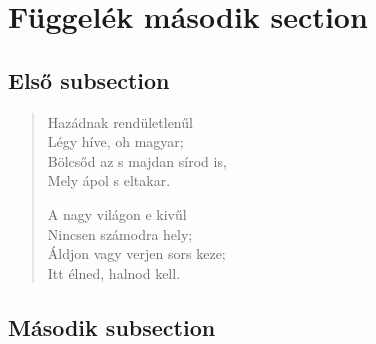 \documentclass[twoside]{article}
\begin{document}
\section{Függelék második section}
\subsection{Első subsection}
\begin{verse}
Hazádnak rendületlenűl\\
Légy híve, oh magyar;\\
Bölcsőd az s majdan sírod is,\\
Mely ápol s eltakar.\newline

A nagy világon e kivűl\\
Nincsen számodra hely;\\
Áldjon vagy verjen sors keze;\\
Itt élned, halnod kell.
\end{verse}
\subsection{Második subsection}
\end{document}
